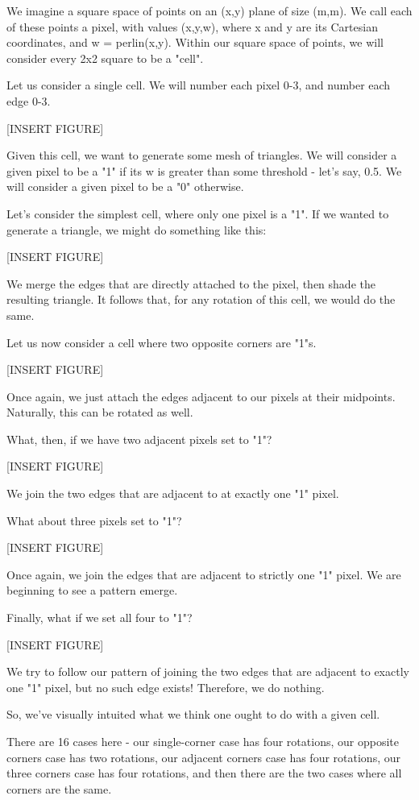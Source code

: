 \documentclass[12pt,twoside]{reedthesis}
\begin{document}
We imagine a square space of points on an (x,y) plane of size (m,m). We call each of these points a pixel, with values (x,y,w), where x and y are its Cartesian coordinates, and w = perlin(x,y).
Within our square space of points, we will consider every 2x2 square to be a "cell".

Let us consider a single cell.
We will number each pixel 0-3, and number each edge 0-3.

[INSERT FIGURE]

Given this cell, we want to generate some mesh of triangles.
We will consider a given pixel to be a "1" if its w is greater than some threshold - let's say, 0.5. We will consider a given pixel to be a "0" otherwise.

Let's consider the simplest cell, where only one pixel is a "1".
If we wanted to generate a triangle, we might do something like this:

[INSERT FIGURE]

We merge the edges that are directly attached to the pixel, then shade the resulting triangle. It follows that, for any rotation of this cell, we would do the same.

Let us now consider a cell where two opposite corners are "1"s.

[INSERT FIGURE]

Once again, we just attach the edges adjacent to our pixels at their midpoints. Naturally, this can be rotated as well.

What, then, if we have two adjacent pixels set to "1"?

[INSERT FIGURE]

We join the two edges that are adjacent to at exactly one "1" pixel.

What about three pixels set to "1"?

[INSERT FIGURE]

Once again, we join the edges that are adjacent to strictly one "1" pixel.
We are beginning to see a pattern emerge.

Finally, what if we set all four to "1"?

[INSERT FIGURE]

We try to follow our pattern of joining the two edges that are adjacent to exactly one "1" pixel, but no such edge exists! Therefore, we do nothing.

So, we've visually intuited what we think one ought to do with a given cell.

There are 16 cases here - our single-corner case has four rotations, our opposite corners case has two rotations, our adjacent corners case has four rotations, our three corners case has four rotations, and then there are the two cases where all corners are the same.
\end{document}
